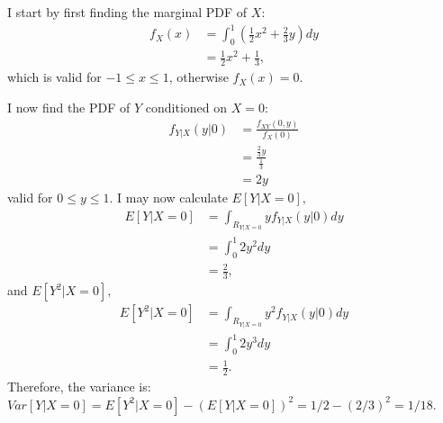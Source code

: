 \begin{problem}{22} I start by first finding the marginal PDF of $X$:
\begin{align*}
f_X(x) &= \int_0^1 \left(\frac{1}{2}x^2+\frac{2}{3}y\right)dy \\
& =\frac{1}{2}x^2 +\frac{1}{3},
\end{align*}
which is valid for $-1 \le x \le 1$, otherwise $f_X(x) =0.$

I now find the PDF of $Y$ conditioned on $X=0$:
\begin{align*}
f_{Y|X}(y|0) &= \frac{f_{XY}(0, y)}{f_X(0)} \\
& = \frac{\frac{2}{3}y}{\frac{1}{3}} \\
& = 2y
\end{align*}
valid for $0\le y \le 1$.  I may now calculate $E[Y|X=0],$
\begin{align*}
E[Y|X=0] &= \int_{R_{Y|X=0}} y f_{Y|X}(y|0) dy \\
& = \int_{0}^1 2y^2 dy  \\
& = \frac{2}{3},
\end{align*}
and $E[Y^2|X=0],$
\begin{align*}
E[Y^2|X=0] &= \int_{R_{Y|X=0}} y^2 f_{Y|X}(y|0) dy \\
& = \int_{0}^1 2 y^3 dy  \\
& = \frac{1}{2}.
\end{align*}
Therefore, the variance is: $Var[Y|X=0] = E[Y^2|X=0] - (E[Y|X=0])^2 = 1/2 - (2/3)^2 = 1/18.$

\end{problem}







